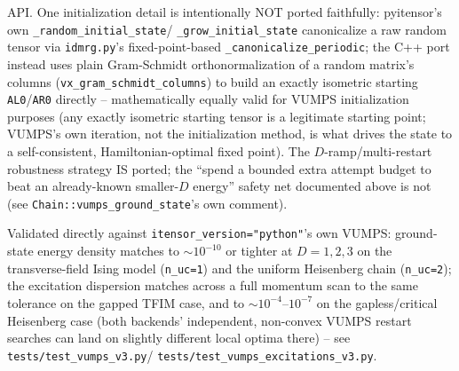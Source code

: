 \documentclass[11pt]{article}
\begin{document}
API. One initialization detail is intentionally NOT ported faithfully:
pyitensor's own \texttt{\_random\_initial\_state}/
\texttt{\_grow\_initial\_state} canonicalize a raw random tensor via
\texttt{idmrg.py}'s fixed-point-based \texttt{\_canonicalize\_periodic};
the C++ port instead uses plain Gram-Schmidt orthonormalization of a
random matrix's columns (\texttt{vx\_gram\_schmidt\_columns}) to build an
exactly isometric starting \texttt{AL0}/\texttt{AR0} directly --
mathematically equally valid for VUMPS initialization purposes (any
exactly isometric starting tensor is a legitimate starting point;
VUMPS's own iteration, not the initialization method, is what drives
the state to a self-consistent, Hamiltonian-optimal fixed point). The
$D$-ramp/multi-restart robustness strategy IS ported; the ``spend a
bounded extra attempt budget to beat an already-known smaller-$D$
energy'' safety net documented above is not (see
\texttt{Chain::vumps\_ground\_state}'s own comment).

Validated directly against \texttt{itensor\_version="python"}'s own
VUMPS: ground-state energy density matches to $\sim10^{-10}$ or tighter
at $D=1,2,3$ on the transverse-field Ising model (\texttt{n\_uc=1}) and
the uniform Heisenberg chain (\texttt{n\_uc=2}); the excitation
dispersion matches across a full momentum scan to the same tolerance on
the gapped TFIM case, and to $\sim10^{-4}$--$10^{-7}$ on the
gapless/critical Heisenberg case (both backends' independent, non-convex
VUMPS restart searches can land on slightly different local optima
there) -- see \texttt{tests/test\_vumps\_v3.py}/
\texttt{tests/test\_vumps\_excitations\_v3.py}.
\end{document}
